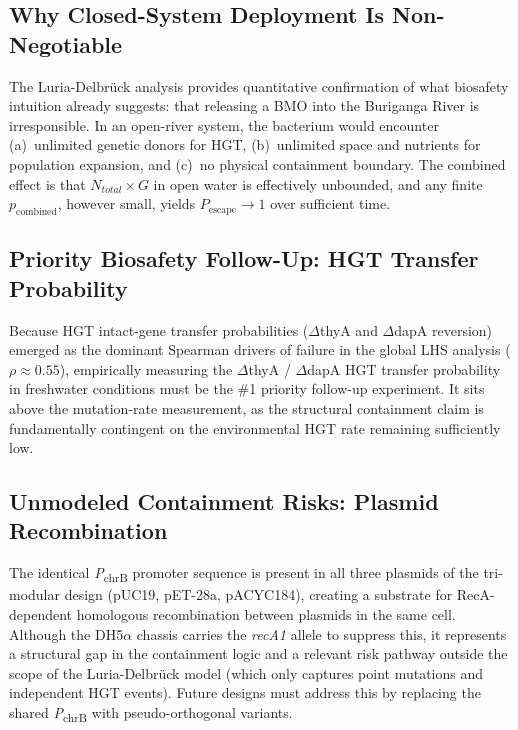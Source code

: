 \documentclass[10pt,twocolumn,letterpaper,
              colorlinks=true,
              linkcolor=blue!70!black,
              citecolor=blue!70!black,
              urlcolor=blue!70!black,
              pdfborder={0 0 0}]{article}
\begin{document}
\subsection{Why Closed-System Deployment Is Non-Negotiable}

The Luria-Delbr\"{u}ck analysis provides quantitative confirmation of
what biosafety intuition already suggests: that releasing a BMO into the
Buriganga River is irresponsible. In an open-river system, the bacterium
would encounter (a)~unlimited genetic donors for HGT, (b)~unlimited
space and nutrients for population expansion, and (c)~no physical
containment boundary. The combined effect is that $N_{total} \times G$
in open water is effectively unbounded, and any finite
$p_{\text{combined}}$, however small, yields $P_{\text{escape}} \to 1$
over sufficient time.

\subsection{Priority Biosafety Follow-Up: HGT Transfer Probability}

Because HGT intact-gene transfer probabilities ($\Delta$thyA and $\Delta$dapA reversion) emerged as the dominant Spearman drivers of failure in the global LHS analysis ($\rho \approx 0.55$), empirically measuring the $\Delta$thyA / $\Delta$dapA HGT transfer probability in freshwater conditions must be the \#1 priority follow-up experiment. It sits above the mutation-rate measurement, as the structural containment claim is fundamentally contingent on the environmental HGT rate remaining sufficiently low.

\subsection{Unmodeled Containment Risks: Plasmid Recombination}

The identical \textit{P}\textsubscript{chrB} promoter sequence is present in all three plasmids of the tri-modular design (pUC19, pET-28a, pACYC184), creating a substrate for RecA-dependent homologous recombination between plasmids in the same cell. Although the DH5$\alpha$ chassis carries the \textit{recA1} allele to suppress this, it represents a structural gap in the containment logic and a relevant risk pathway outside the scope of the Luria-Delbr\"{u}ck model (which only captures point mutations and independent HGT events). Future designs must address this by replacing the shared \textit{P}\textsubscript{chrB} with pseudo-orthogonal variants.
\end{document}

